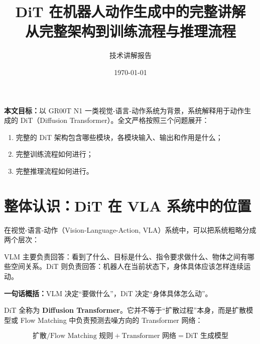 \documentclass[UTF8,11pt,a4paper]{ctexart}
\title{\textbf{DiT 在机器人动作生成中的完整讲解}\\[0.4em]
\large 从完整架构到训练流程与推理流程}
\author{技术讲解报告}
\date{\today}
\begin{document}
\maketitle

\begin{keybox}
\textbf{本文目标：}以 GR00T N1 一类视觉-语言-动作系统为背景，系统解释用于动作生成的 DiT（Diffusion Transformer）。全文严格按照三个问题展开：
\begin{enumerate}
  \item 完整的 DiT 架构包含哪些模块，各模块输入、输出和作用是什么；
  \item 完整训练流程如何进行；
  \item 完整推理流程如何进行。
\end{enumerate}
\end{keybox}

\tableofcontents
\newpage

\section{整体认识：DiT 在 VLA 系统中的位置}

在视觉-语言-动作（Vision-Language-Action, VLA）系统中，可以把系统粗略分成两个层次：

\begin{center}
\end{center}

VLM 主要负责回答：看到了什么、目标是什么、指令要求做什么、物体之间有哪些空间关系。DiT 则负责回答：机器人在当前状态下，身体具体应该怎样连续运动。

\begin{keybox}
\textbf{一句话概括：}VLM 决定“要做什么”，DiT 决定“身体具体怎么动”。
\end{keybox}

DiT 全称为 \textbf{Diffusion Transformer}。它并不等于“扩散过程”本身，而是扩散模型或 Flow Matching 中负责预测去噪方向的 Transformer 网络：

\[
\text{扩散/Flow Matching 规则} + \text{Transformer 网络} = \text{DiT 生成模型}
\]
\end{document}
